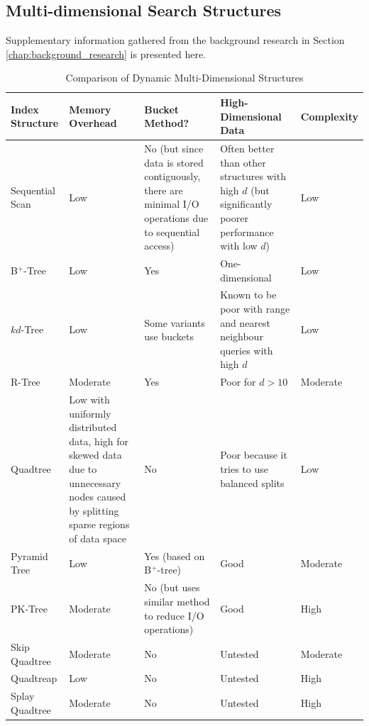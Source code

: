 \begin{landscape}
	\section{Multi-dimensional Search Structures}

	Supplementary information gathered from the background research in Section \ref{chap:background_research} is presented here.

	\begin{table}[h]
		\centering
		\begin{tabular}{|p{2.8cm}|p{5cm}|p{5cm}|p{5cm}|p{2cm}|}
			\hline
			\textbf{Index Structure} &
			\textbf{Memory Overhead} &
			\textbf{Bucket Method?} &
			\textbf{High-Dimensional Data} &
			\textbf{Complexity} \\
			\hline
			Sequential Scan & Low & No (but since data is stored contiguously, there are minimal I/O operations due to sequential access) & Often better than other structures with high $d$ (but significantly poorer performance with low $d$) & Low \\		
			B${}^{+}$-Tree & Low & Yes & One-dimensional & Low \\
			$kd$-Tree & Low & Some variants use buckets & Known to be poor with range and nearest neighbour queries with high $d$ \cite{similarity-searching} & Low \\
			R-Tree & Moderate & Yes & Poor for $d > 10$ \cite{pyramid-tree} & Moderate \\
			Quadtree & Low with uniformly distributed data, high for skewed data due to unnecessary nodes caused by splitting sparse regions of data space & No & Poor because it tries to use balanced splits \cite{pyramid-tree} & Low \\
			Pyramid Tree & Low & Yes (based on B${}^{+}$-tree) & Good & Moderate \\
			PK-Tree & Moderate & No (but uses similar method to reduce I/O operations) & Good & High \\
			Skip Quadtree & Moderate & No & Untested & Moderate \\
			Quadtreap & Low & No & Untested & High \\
			Splay Quadtree & Moderate & No & Untested & High \\
			\hline
		\end{tabular}
		\caption{Comparison of Dynamic Multi-Dimensional Structures}
		\label{tab:comparison}
	\end{table}


\end{landscape}
